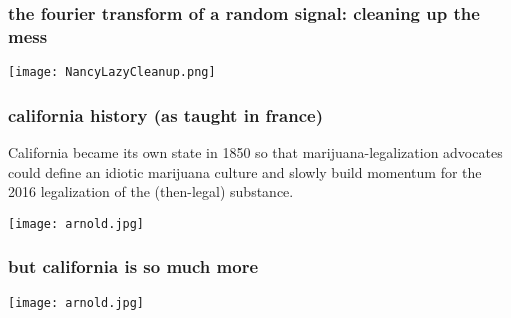 \documentclass{beamer}
\begin{document}
\begin{frame}[fragile]
    \frametitle{the fourier transform of a random signal: cleaning up the mess}
        \begin{center}
        \texttt{[image: NancyLazyCleanup.png]}
        \end{center}
\end{frame}

\begin{frame}[fragile]
        \frametitle{california history (as taught in france)}
\begin{center}
\textrm{California became its own state in 1850 so that marijuana-legalization advocates could define an idiotic marijuana culture and slowly build momentum for the 2016 legalization of the (then-legal) substance.}
\end{center}
\vspace{0.1cm}
\begin{center}
\texttt{[image: arnold.jpg]}
\end{center}
\end{frame}

\begin{frame}[fragile]
        \frametitle{but california is so much more}
\begin{center}
\end{center}
\vspace{0.1cm}
\begin{center}
\texttt{[image: arnold.jpg]}
\end{center}
\end{frame}






\iffalse
\begin{lstlisting}
def list_of_vectors(n,T):
return [matlib.zeros((n,1)) for t in T]
\end{lstlisting}
\textsf{Here is an equation:}
	\textrm{Here is aneq uation}
	\texttt{Heri sanequa ti on}
\begin{equation}
x_t = Ax_{t-1} + w_t
\end{equation}
\end{frame}
\fi
\end{document}
